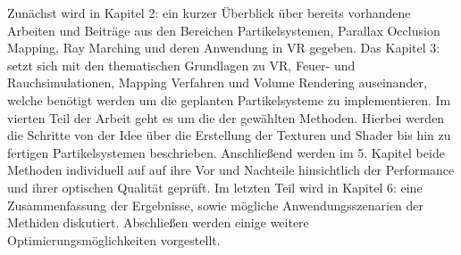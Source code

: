 Zunächst wird in Kapitel 2: \textbf{} ein kurzer Überblick über bereits vorhandene Arbeiten
und Beiträge aus den Bereichen Partikelsystemen, Parallax Occlusion Mapping, Ray Marching und deren Anwendung in VR gegeben.
Das Kapitel 3: \textbf{} setzt sich mit den thematischen Grundlagen zu VR, Feuer- und Rauchsimulationen,
Mapping Verfahren und Volume Rendering auseinander, welche benötigt werden um die geplanten Partikelsysteme zu implementieren.
Im vierten Teil der Arbeit geht es um die \textbf{} der gewählten Methoden. Hierbei werden die Schritte 
von der Idee über die Erstellung der Texturen und Shader bis hin zu fertigen Partikelsystemen beschrieben.
Anschließend werden im 5. Kapitel \textbf{} beide  Methoden individuell auf auf ihre Vor und Nachteile hinsichtlich 
der Performance und ihrer optischen Qualität geprüft. 
Im letzten Teil wird in Kapitel 6: \textbf{} eine Zusammenfassung der Ergebnisse, sowie mögliche Anwendungsszenarien
der Methiden diskutiert. Abschließen werden einige weitere Optimierungsmöglichkeiten vorgestellt. 



